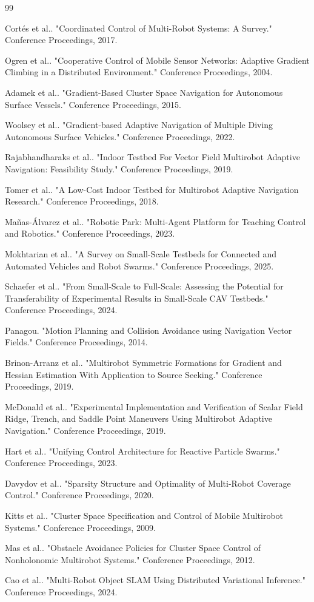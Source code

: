 \documentclass[lettersize,journal]{IEEEtran}
\begin{document}
\begin{thebibliography}{99}

 Cortés et al.. "Coordinated Control of Multi-Robot Systems: A Survey." Conference Proceedings, 2017.

 Ogren et al.. "Cooperative Control of Mobile Sensor Networks: Adaptive Gradient Climbing in a Distributed Environment." Conference Proceedings, 2004.

 Adamek et al.. "Gradient-Based Cluster Space Navigation for Autonomous Surface Vessels." Conference Proceedings, 2015.

 Woolsey et al.. "Gradient-based Adaptive Navigation of Multiple Diving Autonomous Surface Vehicles." Conference Proceedings, 2022.

 Rajabhandharaks et al.. "Indoor Testbed For Vector Field Multirobot Adaptive Navigation: Feasibility Study." Conference Proceedings, 2019.

 Tomer et al.. "A Low-Cost Indoor Testbed for Multirobot Adaptive Navigation Research." Conference Proceedings, 2018.

 Mañas-Álvarez et al.. "Robotic Park: Multi-Agent Platform for Teaching Control and Robotics." Conference Proceedings, 2023.

 Mokhtarian et al.. "A Survey on Small-Scale Testbeds for Connected and Automated Vehicles and Robot Swarms." Conference Proceedings, 2025.

 Schaefer et al.. "From Small-Scale to Full-Scale: Assessing the Potential for Transferability of Experimental Results in Small-Scale CAV Testbeds." Conference Proceedings, 2024.

 Panagou. "Motion Planning and Collision Avoidance using Navigation Vector Fields." Conference Proceedings, 2014.

 Brinon-Arranz et al.. "Multirobot Symmetric Formations for Gradient and Hessian Estimation With Application to Source Seeking." Conference Proceedings, 2019.

 McDonald et al.. "Experimental Implementation and Verification of Scalar Field Ridge, Trench, and Saddle Point Maneuvers Using Multirobot Adaptive Navigation." Conference Proceedings, 2019.

 Hart et al.. "Unifying Control Architecture for Reactive Particle Swarms." Conference Proceedings, 2023.

 Davydov et al.. "Sparsity Structure and Optimality of Multi-Robot Coverage Control." Conference Proceedings, 2020.

 Kitts et al.. "Cluster Space Specification and Control of Mobile Multirobot Systems." Conference Proceedings, 2009.

 Mas et al.. "Obstacle Avoidance Policies for Cluster Space Control of Nonholonomic Multirobot Systems." Conference Proceedings, 2012.

 Cao et al.. "Multi-Robot Object SLAM Using Distributed Variational Inference." Conference Proceedings, 2024.

\end{thebibliography}
\end{document}
